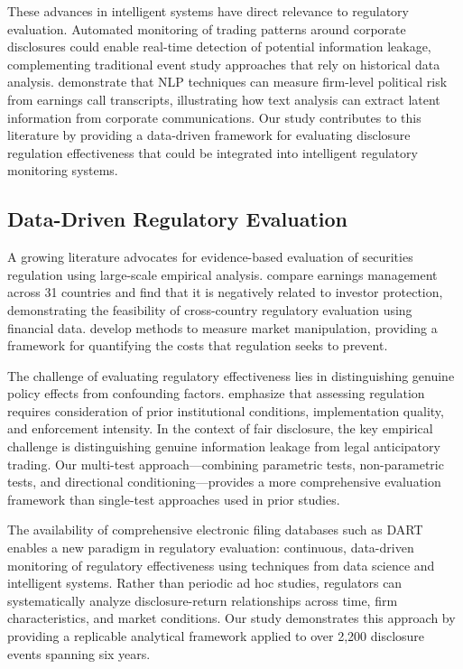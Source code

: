 \documentclass[manuscript,review]{acmart}
\begin{document}
These advances in intelligent systems have direct relevance to regulatory evaluation. Automated monitoring of trading patterns around corporate disclosures could enable real-time detection of potential information leakage, complementing traditional event study approaches that rely on historical data analysis. \citet{hassan2019firm} demonstrate that NLP techniques can measure firm-level political risk from earnings call transcripts, illustrating how text analysis can extract latent information from corporate communications. Our study contributes to this literature by providing a data-driven framework for evaluating disclosure regulation effectiveness that could be integrated into intelligent regulatory monitoring systems.

\subsection{Data-Driven Regulatory Evaluation}

A growing literature advocates for evidence-based evaluation of securities regulation using large-scale empirical analysis. \citet{leuz2003earnings} compare earnings management across 31 countries and find that it is negatively related to investor protection, demonstrating the feasibility of cross-country regulatory evaluation using financial data. \citet{comerton2009measuring} develop methods to measure market manipulation, providing a framework for quantifying the costs that regulation seeks to prevent.

The challenge of evaluating regulatory effectiveness lies in distinguishing genuine policy effects from confounding factors. \citet{christensen2013capital} emphasize that assessing regulation requires consideration of prior institutional conditions, implementation quality, and enforcement intensity. In the context of fair disclosure, the key empirical challenge is distinguishing genuine information leakage from legal anticipatory trading. Our multi-test approach---combining parametric tests, non-parametric tests, and directional conditioning---provides a more comprehensive evaluation framework than single-test approaches used in prior studies.

The availability of comprehensive electronic filing databases such as DART enables a new paradigm in regulatory evaluation: continuous, data-driven monitoring of regulatory effectiveness using techniques from data science and intelligent systems. Rather than periodic ad hoc studies, regulators can systematically analyze disclosure-return relationships across time, firm characteristics, and market conditions. Our study demonstrates this approach by providing a replicable analytical framework applied to over 2,200 disclosure events spanning six years.
\end{document}
